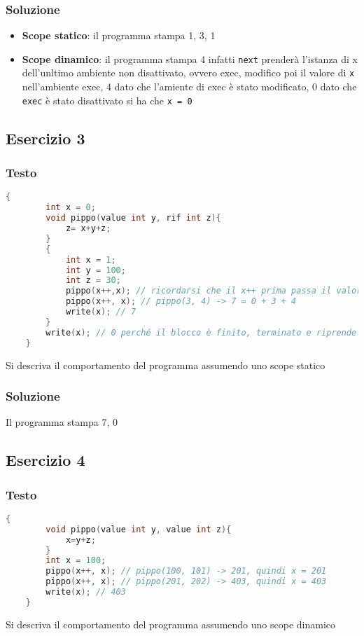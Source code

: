 \subsubsection{Soluzione}
\begin{itemize}
    \item \textbf{Scope statico}: il programma stampa 1, 3, 1
    \item \textbf{Scope dinamico}: il programma stampa 4 infatti \texttt{next} prenderà l'istanza di x dell'unltimo ambiente non disattivato, ovvero exec, modifico poi il valore di \texttt{x} nell'ambiente exec, 4 dato che l'amiente di exec è stato modificato, 0 dato che \texttt{exec} è stato disattivato si ha che \texttt{x = 0}
\end{itemize}

\subsection{Esercizio 3}
\subsubsection{Testo}
\begin{lstlisting}[language=C]
    {
        int x = 0;
        void pippo(value int y, rif int z){
            z= x+y+z;
        }
        {
            int x = 1;
            int y = 100;
            int z = 30;
            pippo(x++,x); // ricordarsi che il x++ prima passa il valore di x nudo e crudo poi come side-effect modica x staticamente in questo caso, pertanto il secondo parametro sarà 2: pippo(1, 2) -> 3 = 0+ 1 +2
            pippo(x++, x); // pippo(3, 4) -> 7 = 0 + 3 + 4
            write(x); // 7
        }
        write(x); // 0 perché il blocco è finito, terminato e riprende la variabile x dichiarata all'inizio
    }
\end{lstlisting}
Si descriva il comportamento del programma assumendo uno scope statico

\subsubsection{Soluzione}
Il programma stampa 7, 0

\subsection{Esercizio 4}
\subsubsection{Testo}
\begin{lstlisting}[language=C]
    {
        void pippo(value int y, value int z){
            x=y+z;
        }
        int x = 100;
        pippo(x++, x); // pippo(100, 101) -> 201, quindi x = 201
        pippo(x++, x); // pippo(201, 202) -> 403, quindi x = 403
        write(x); // 403
    }
\end{lstlisting}
Si descriva il comportamento del programma assumendo uno scope dinamico

